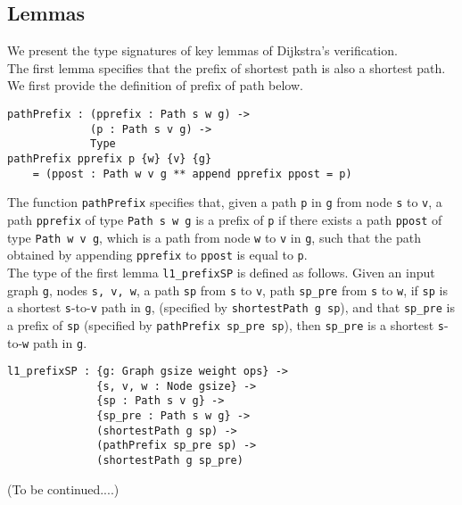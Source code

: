 
\subsection{Lemmas}
We present the type signatures of key lemmas of Dijkstra's verification. 
\\

The first lemma specifies that the prefix of shortest path is also a shortest path. We first provide the definition of prefix of path below. 
\begin{lstlisting}
pathPrefix : (pprefix : Path s w g) ->
             (p : Path s v g) ->
             Type
pathPrefix pprefix p {w} {v} {g} 
	= (ppost : Path w v g ** append pprefix ppost = p)
\end{lstlisting}
The function \texttt{pathPrefix} specifies that, given a path \texttt{p} in \texttt{g} from node \texttt{s} to \texttt{v}, a path \texttt{pprefix} of type \texttt{Path s w g} is a prefix of \texttt{p} if there exists a path \texttt{ppost} of type \texttt{Path w v g}, which is a path from node \texttt{w} to \texttt{v} in \texttt{g}, such that the path obtained by appending \texttt{pprefix} to \texttt{ppost} is equal to \texttt{p}. 
\\

The type of the first lemma \texttt{l1\_prefixSP} is defined as follows. Given an input graph \texttt{g}, nodes \texttt{s, v, w}, a path \texttt{sp} from \texttt{s} to \texttt{v}, path \texttt{sp\_pre} from \texttt{s} to \texttt{w}, if \texttt{sp} is a shortest \texttt{s}-to-\texttt{v} path in \texttt{g}, (specified by \texttt{shortestPath g sp}), and that \texttt{sp\_pre} is a prefix of \texttt{sp} (specified by \texttt{pathPrefix sp\_pre sp}), then \texttt{sp\_pre} is a shortest  \texttt{s}-to-\texttt{w} path in \texttt{g}. 
\begin{lstlisting}
l1_prefixSP : {g: Graph gsize weight ops} ->
              {s, v, w : Node gsize} ->
              {sp : Path s v g} ->
              {sp_pre : Path s w g} ->
              (shortestPath g sp) ->
              (pathPrefix sp_pre sp) ->
              (shortestPath g sp_pre)
\end{lstlisting}

(To be continued....)